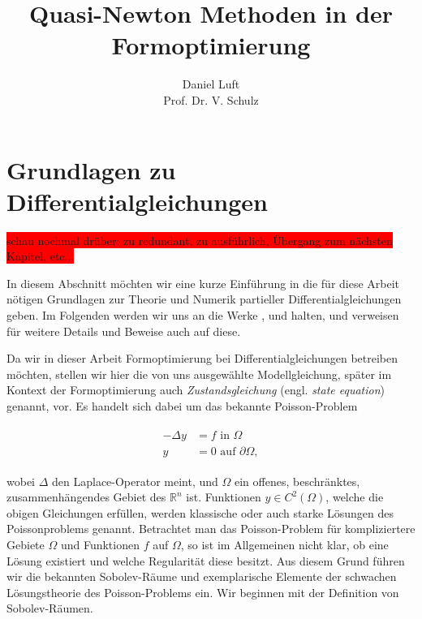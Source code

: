 \documentclass[bibliography=totoc,12pt,a4paper]{scrartcl}
\theoremstyle{exampstyle}
\numberwithin{equation}{section}
\begin{document}
\title{Quasi-Newton Methoden in der Formoptimierung}

\author{Daniel Luft \\ Prof. Dr. V. Schulz}

  \pagestyle{empty}

  \pagestyle{headings}
  

\section{Grundlagen zu Differentialgleichungen}


\colorbox{red}{schau nochmal drüber: zu redundant, zu ausführlich, Übergang zum nächsten Kapitel, etc...}

In diesem Abschnitt möchten wir eine kurze Einführung in die für diese Arbeit nötigen Grundlagen zur Theorie und Numerik partieller Differentialgleichungen geben. Im Folgenden werden wir uns an die Werke \cite{PDE1}, \cite{PDE2} und \cite{PDE3} halten, und verweisen für weitere Details und Beweise auch auf diese.

Da wir in dieser Arbeit Formoptimierung bei Differentialgleichungen betreiben möchten, stellen wir hier die von uns ausgewählte Modellgleichung, später im Kontext der Formoptimierung auch \textit{Zustandsgleichung} (engl. \textit{state equation}) genannt, vor. Es handelt sich dabei um das bekannte Poisson-Problem

\begin{align}\label{Poissonproblem}
	\begin{aligned}
	-\Delta y &=  f  \text{ in } \Omega \; \\ y &= 0 \text{ auf } \partial \Omega,
	\end{aligned}
\end{align}

wobei $\Delta$ den Laplace-Operator meint, und $\Omega$ ein offenes, beschränktes, zusammenhängendes Gebiet des $\mathbb{R}^n$ ist. Funktionen $y\in C^2(\Omega)$, welche die obigen Gleichungen erfüllen, werden klassische oder auch starke Lösungen des Poissonproblems genannt. Betrachtet man das Poisson-Problem für kompliziertere Gebiete $\Omega$ und Funktionen $f$ auf $\Omega$, so ist im Allgemeinen nicht klar, ob eine Lösung existiert und welche Regularität diese besitzt. Aus diesem Grund führen wir die bekannten Sobolev-Räume und exemplarische Elemente der schwachen Lösungstheorie des Poisson-Problems ein. Wir beginnen mit der Definition von Sobolev-Räumen.
\end{document}
